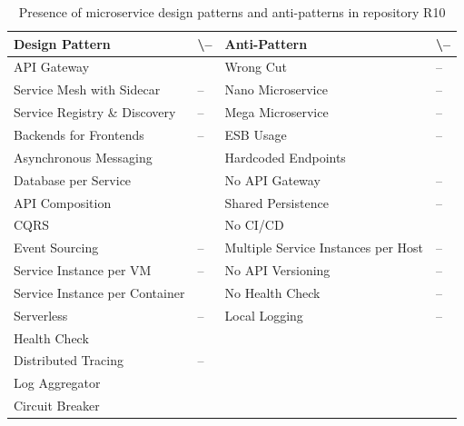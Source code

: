 \documentclass{Configuration_Files/PoliMi3i_thesis}
\newcommand{\cmark}{\ding{51}}%
\begin{document}
\begin{table}[H]
\centering 
    \begin{tabular}{ 
  | >{\centering\arraybackslash} m{16em} 
  | >{\centering\arraybackslash} m{2.2em} 
  | >{\centering\arraybackslash} m{16em} 
  | >{\centering\arraybackslash} m{2.2em} | }
    \hline
    \rowcolor{bluepoli!40}
    \textbf{Design Pattern} & \cmark \textbackslash – & \textbf{Anti-Pattern} & \cmark \textbackslash – \T\B \\
    \hline \hline
    API Gateway & \cmark & Wrong Cut & – \T\B\\
    \hline
    \rowcolor{bluepoli!10}
    Service Mesh with Sidecar & – & Nano Microservice & – \T\B \\
    \hline
    Service Registry \& Discovery & – & Mega Microservice & – \T\B \\
    \hline
    \rowcolor{bluepoli!10}
    Backends for Frontends & – & ESB Usage & – \T\B \\
    \hline
    Asynchronous Messaging & \cmark & Hardcoded Endpoints & \cmark \T\B \\
    \hline
    \rowcolor{bluepoli!10}
    Database per Service & \cmark & No API Gateway & – \T\B \\
    \hline
    API Composition & \cmark & Shared Persistence & – \T\B \\
    \hline
    \rowcolor{bluepoli!10}
    CQRS & \cmark & No CI/CD & \cmark \T\B \\
    \hline
    Event Sourcing & – & Multiple Service Instances per Host & – \T\B \\
    \hline
    \rowcolor{bluepoli!10}
    Service Instance per VM & – & No API Versioning & – \T\B \\
    \hline
    Service Instance per Container & \cmark & No Health Check & – \T\B \\
    \hline
    \rowcolor{bluepoli!10}
    Serverless & – & Local Logging & – \T\B \\
    \hline
    Health Check & \cmark &  & \T\B \\
    \hline
    \rowcolor{bluepoli!10}
    Distributed Tracing & – & & \T\B \\
    \hline
    Log Aggregator & \cmark &  & \T\B \\
    \hline
    \rowcolor{bluepoli!10}
    Circuit Breaker & \cmark &  & \T\B \\
    \hline
    \end{tabular}
    \\[10pt]
    \caption{Presence of microservice design patterns and anti-patterns in repository R10}
    \label{table:R10_result}
\end{table}
\end{document}

